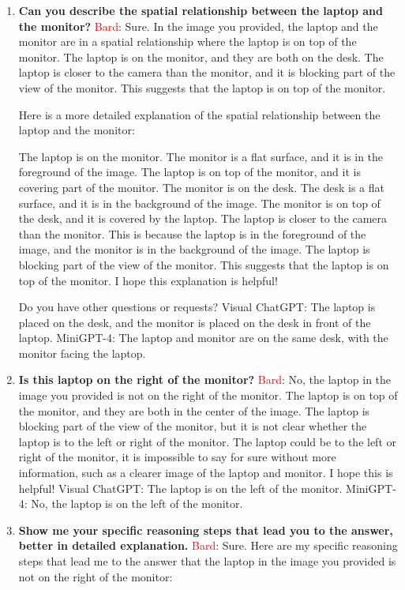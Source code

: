 \begin{enumerate}
    \item \textbf{Can you describe the spatial relationship between the laptop and the monitor?}
    \subitem \textcolor{Red}{Bard}: 
    Sure. In the image you provided, the laptop and the monitor are in a spatial relationship where the laptop is on top of the monitor. The laptop is on the monitor, and they are both on the desk. The laptop is closer to the camera than the monitor, and it is blocking part of the view of the monitor. This suggests that the laptop is on top of the monitor.

    Here is a more detailed explanation of the spatial relationship between the laptop and the monitor:

    The laptop is on the monitor. The monitor is a flat surface, and it is in the foreground of the image. The laptop is on top of the monitor, and it is covering part of the monitor.
    The monitor is on the desk. The desk is a flat surface, and it is in the background of the image. The monitor is on top of the desk, and it is covered by the laptop.
    The laptop is closer to the camera than the monitor. This is because the laptop is in the foreground of the image, and the monitor is in the background of the image.
    The laptop is blocking part of the view of the monitor. This suggests that the laptop is on top of the monitor.
    I hope this explanation is helpful!

    Do you have other questions or requests?
    \subitem Visual ChatGPT: The laptop is placed on the desk, and the monitor is placed on the desk in front of the laptop.
    \subitem MiniGPT-4: The laptop and monitor are on the same desk, with the monitor facing the laptop.
    \item \textbf{Is this laptop on the right of the monitor?}
    \subitem \textcolor{Red}{Bard}: 
    No, the laptop in the image you provided is not on the right of the monitor. The laptop is on top of the monitor, and they are both in the center of the image. The laptop is blocking part of the view of the monitor, but it is not clear whether the laptop is to the left or right of the monitor. The laptop could be to the left or right of the monitor, it is impossible to say for sure without more information, such as a clearer image of the laptop and monitor.
    I hope this is helpful!
    \subitem Visual ChatGPT: The laptop is on the left of the monitor.
    \subitem MiniGPT-4: No, the laptop is on the left of the monitor.
    \item \textbf{Show me your specific reasoning steps that lead you to the answer, better in detailed explanation.}
    \subitem \textcolor{Red}{Bard}: 
    Sure. Here are my specific reasoning steps that lead me to the answer that the laptop in the image you provided is not on the right of the monitor:
    

\end{enumerate}
